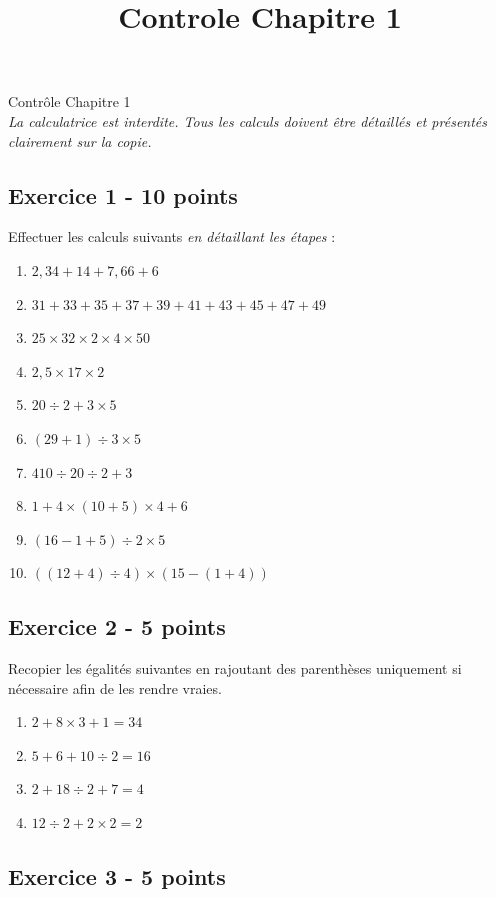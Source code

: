\documentclass[14 pt]{extarticle}
\title{Controle Chapitre 1}
\date{}
\theoremstyle{plain}
\begin{document}
\begin{center}{\Large Contrôle Chapitre 1}\\ 

\emph{La calculatrice est interdite. Tous les calculs doivent être détaillés et présentés clairement sur la copie. }
 \end{center}
 
  

\subsection*{Exercice 1 - 10 points} 
 
Effectuer les calculs suivants \emph{en détaillant les étapes} : 
 
 \begin{enumerate}
 \item $ 2,34 + 14 + 7,66 + 6 $
 \item $ 31 + 33 +35 + 37 + 39 + 41 +43+45 + 47 +49 $
 \item $25 \times 32 \times 2 \times 4\times 50$
 \item $ 2,5 \times 17 \times 2 $
 \item $ 20 \div 2 + 3 \times 5$
 \item $ (29 +1)\div 3 \times 5$
 \item $410 \div 20 \div 2 + 3 $
 \item $ 1 + 4 \times (10 + 5) \times 4 + 6$
 \item $ (16 - 1 + 5)\div 2 \times 5$
 \item $ ( ( 12 + 4 ) \div 4 ) \times ( 15 - ( 1 + 4 ) )$
 \end{enumerate}
 
 \subsection*{Exercice 2 - 5 points}
 
 Recopier les égalités suivantes en rajoutant des parenthèses uniquement si nécessaire afin de les rendre vraies. 
 
 \begin{enumerate}
 \item $2 + 8 \times 3 + 1 = 34$
 \item $5 + 6 + 10 \div 2  = 16$
 \item $2 + 18 \div 2 + 7 = 4 $
 \item $ 12 \div 2 + 2 \times 2 = 2 $
 \end{enumerate}
 

 \subsection*{Exercice 3 - 5 points} 
 
\end{document}
